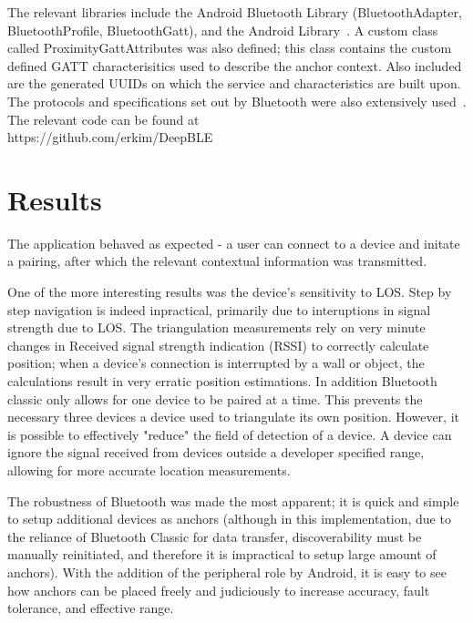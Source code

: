 \documentclass{sig-alternate}
\begin{document}
The relevant libraries include the Android Bluetooth Library 
(BluetoothAdapter, BluetoothProfile, BluetoothGatt), and the
Android Library~\cite{android}.
A custom class called ProximityGattAttributes was also defined;
this class contains the custom defined GATT characterisitics
used to describe the anchor context. Also included are the
generated UUIDs on which the service and characteristics 
are built upon.
The protocols and specifications set out by Bluetooth 
were also extensively used~\cite{bluetooth_core}.
The relevant code can be found at 
\\ https://github.com/erkim/DeepBLE

\section{Results}
\label{sec:results}
The application behaved as expected - a user can connect
to a device and initate a pairing, after which the relevant contextual
information was transmitted. 

One of the more interesting results was the device's sensitivity
to LOS. Step by step navigation is indeed inpractical, primarily
due to interuptions in signal strength due to LOS. The triangulation
measurements rely on very minute changes in Received signal 
strength indication (RSSI) to correctly calculate position; when
a device's connection is interrupted by a wall or object, the
calculations result in very erratic position estimations. In addition
Bluetooth classic only allows for one device to be paired at
a time. This prevents the necessary three devices a device
used to triangulate its own position. However, it is possible 
to effectively "reduce" the field of detection of a device. A device
can ignore the signal received from devices outside a 
developer specified range, allowing for more accurate 
location measurements.

The robustness of Bluetooth was made the most apparent; 
it is quick and simple to setup additional devices as anchors
(although in this implementation, due to the reliance of Bluetooth
Classic for data transfer, discoverability must be manually
reinitiated, and therefore it is impractical to setup large
amount of anchors). With the addition of the peripheral role
by Android, it is easy to see how anchors can be placed
freely and judiciously to increase accuracy, fault tolerance,
and effective range. 
\end{document}
